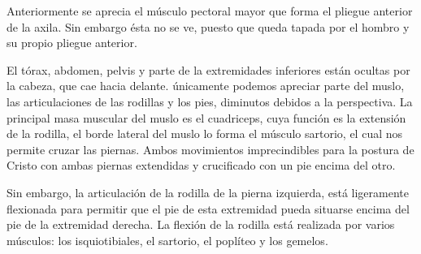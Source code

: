 Anteriormente se aprecia el músculo pectoral mayor que forma el pliegue anterior de la axila. Sin embargo ésta no se ve, puesto que queda tapada por el hombro y su propio pliegue anterior.

El tórax, abdomen, pelvis y parte de la extremidades inferiores están ocultas por la cabeza, que cae hacia delante. únicamente podemos apreciar parte del muslo, las articulaciones de las rodillas y los pies, diminutos debidos a la perspectiva. La principal masa muscular del muslo es el cuadriceps, cuya función es la extensión de la rodilla, el borde lateral del muslo lo forma el músculo sartorio, el cual nos permite cruzar las piernas. Ambos movimientos imprecindibles para la postura de Cristo con ambas piernas extendidas y crucificado con un pie encima del otro.

Sin embargo, la articulación de la rodilla de la pierna izquierda, está ligeramente flexionada para permitir que el pie de esta extremidad pueda situarse encima del pie de la extremidad derecha. La flexión de la rodilla está realizada por varios músculos: los isquiotibiales, el sartorio, el poplíteo y los gemelos.
